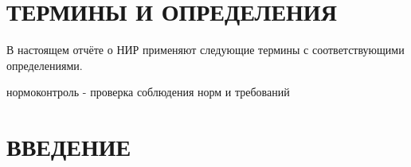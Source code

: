 \section*{ТЕРМИНЫ И ОПРЕДЕЛЕНИЯ}

В настоящем отчёте о НИР применяют следующие термины с соответствующими
определениями.

нормоконтроль - проверка соблюдения норм и требований %

\section*{ВВЕДЕНИЕ}
